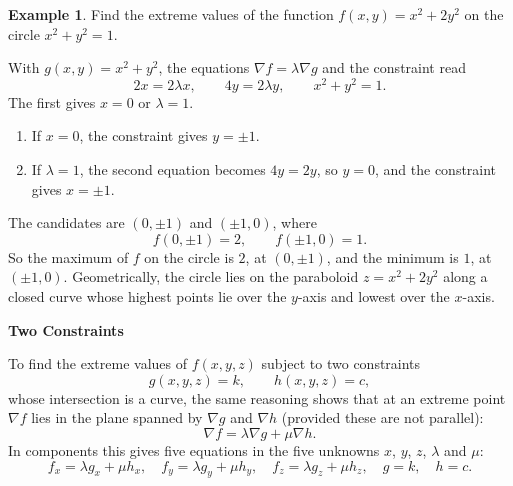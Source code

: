 \documentclass[11pt,a4paper]{article}
\theoremstyle{definition}
\newtheorem{exa}[thm]{Example}
\newcommand{\subhead}[1]{%
  \par\medskip\noindent\textbf{#1}\par\nobreak\smallskip}
\begin{document}
\begin{exa}
\label{ex:lagrangeellipse}
Find the extreme values of the function $f(x,y) = x^2 + 2y^2$ on the circle
$x^2 + y^2 = 1$.

With $g(x,y) = x^2 + y^2$, the equations $\nabla f = \lambda\nabla g$ and the
constraint read
\[2x = 2\lambda x,\qquad 4y = 2\lambda y,\qquad x^2 + y^2 = 1 .\]
The first gives $x = 0$ or $\lambda = 1$.
\begin{enumerate}
\item[$-$] If $x = 0$, the constraint gives $y = \pm 1$.
\item[$-$] If $\lambda = 1$, the second equation becomes $4y = 2y$, so $y = 0$,
and the constraint gives $x = \pm 1$.
\end{enumerate}
The candidates are $(0,\pm1)$ and $(\pm1,0)$, where
\[f(0,\pm1) = 2,\qquad f(\pm1,0) = 1 .\]
So the maximum of $f$ on the circle is $2$, at $(0,\pm 1)$, and the minimum is
$1$, at $(\pm 1, 0)$. Geometrically, the circle lies on the paraboloid
$z = x^2 + 2y^2$ along a closed curve whose highest points lie over the
$y$-axis and lowest over the $x$-axis.

\begin{figure}[H]
\centering
{}
\end{figure}
\end{exa}

\subhead{Two Constraints}

To find the extreme values of $f(x,y,z)$ subject to two constraints
\[g(x,y,z) = k,\qquad h(x,y,z) = c ,\]
whose intersection is a curve, the same reasoning shows that at an extreme
point $\nabla f$ lies in the plane spanned by $\nabla g$ and $\nabla h$
(provided these are not parallel):
\[\nabla f =\lambda \nabla g + \mu \nabla h .\]
In components this gives five equations in the five unknowns $x$, $y$, $z$,
$\lambda$ and $\mu$:
\[f_x = \lambda g_x + \mu h_x,\quad f_y = \lambda g_y + \mu h_y,\quad f_z =
\lambda g_z + \mu h_z,\quad g = k,\quad h = c .\]
\end{document}
